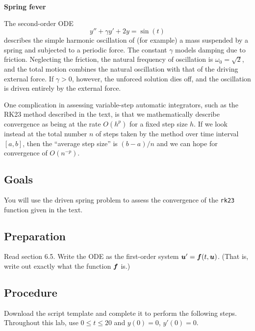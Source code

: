 \documentclass[11pt,twoside]{article}
\begin{document}
\begin{center}
  \bf Spring fever
\end{center}

 The second-order ODE
\[
  y'' + \gamma y' + 2y = \sin(t)
\]
describes the simple harmonic oscillation of (for example) a mass
suspended by a spring and subjected to a periodic force. The constant
$\gamma$ models damping due to friction. Neglecting the friction, the
natural frequency of oscillation is $\omega_0=\sqrt{2}$, and the total
motion combines the natural oscillation with that of the driving
external force. If $\gamma>0$, however, the unforced solution dies
off, and the oscillation is driven entirely by the external force.

One complication in assessing variable-step automatic integrators, such as the RK23 method described in the text, is that we mathematically describe convergence as being at the rate $O(h^p)$ for a fixed step size $h$. If we look instead at the total number $n$ of steps taken by the method over time interval $[a,b]$, then the ``average step size'' is $(b-a)/n$ and we can hope for convergence of $O(n^{-p})$. 

\subsection*{Goals}

You will use the driven spring problem to assess the convergence of the \texttt{rk23} function given in the text.

\subsection*{Preparation}

Read section 6.5. Write the ODE as the first-order system $\bm{u}' = \bm{f}(t,\bm{u})$. (That is, write out exactly what the function $\bm{f}$ is.) 

\subsection*{Procedure}

Download the script template and complete it to perform the following steps. Throughout this lab, use $0\le t \le 20$ and $y(0)=0$, $y'(0)=0$.
\end{document}
